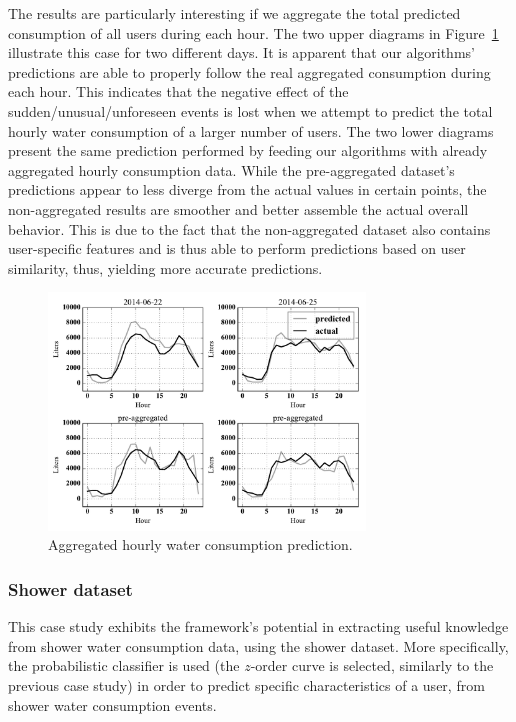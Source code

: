 The results are particularly interesting if we aggregate the total predicted consumption of all users during each hour. The two upper diagrams in Figure~\ref{figure9} illustrate this case for two different days. It is apparent that our algorithms' predictions are able to properly follow the real aggregated consumption during each hour. This indicates that the negative effect of the sudden/unusual/unforeseen events is lost when we attempt to predict the total hourly water consumption of a larger number of users. The two lower diagrams present the same prediction performed by feeding our algorithms with already aggregated hourly consumption data. While the pre-aggregated dataset's predictions appear to less diverge from the actual values in certain points, the non-aggregated results are smoother and better assemble the actual overall behavior. This is due to the fact that the non-aggregated dataset also contains user-specific features and is thus able to perform predictions based on user similarity, thus, yielding more accurate predictions.

\begin{figure}[!tb]
	\centering
	\includegraphics[width=0.75\textwidth]{figures/figure9.pdf}
	\caption{Aggregated hourly water consumption prediction.}
	\label{figure9}
\end{figure}

\subsubsection{Shower dataset}
\label{subsubsec:case_study2}
This case study exhibits the framework's potential in extracting useful knowledge from shower water consumption data, using the shower dataset. More specifically, the probabilistic classifier is used (the $z$-order curve is selected, similarly to the previous case study) in order to predict specific characteristics of a user, from shower water consumption events.

